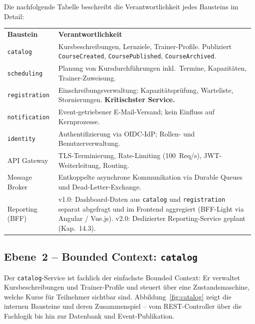 Die nachfolgende Tabelle beschreibt die Verantwortlichkeit
jedes Bausteins im Detail:

\begin{tabularx}{\textwidth}{L{2.8cm} X}
  \color{white}\textbf{Baustein} &
  \color{white}\textbf{Verantwortlichkeit} \\

  \texttt{catalog} &
  Kursbeschreibungen, Lernziele, Trainer-Profile.
  Publiziert \texttt{CourseCreated},
  \texttt{CoursePublished},
  \texttt{CourseArchived}. \\

  \texttt{scheduling} &
  Planung von Kursdurchführungen inkl.\ Termine,
  Kapazitäten, Trainer-Zuweisung. \\

  \texttt{registration} &
  Einschreibungsverwaltung: Kapazitätsprüfung,
  Warteliste, Stornierungen.
  \textbf{Kritischster Service.} \\

  \texttt{notification} &
  Event-getriebener E-Mail-Versand; kein Einfluss
  auf Kernprozesse. \\

  \texttt{identity} &
  Authentifizierung via OIDC-IdP; Rollen- und
  Benutzerverwaltung. \\

  API Gateway &
  TLS-Terminierung, Rate-Limiting (100~Req/s),
  JWT-Weiterleitung, Routing. \\

  Message Broker &
  Entkoppelte asynchrone Kommunikation via
  Durable Queues und Dead-Letter-Exchange. \\

  Reporting (BFF) &
  v1.0: Dashboard-Daten aus \texttt{catalog} und
  \texttt{registration} separat abgefragt und im
  Frontend aggregiert (BFF-Light via Angular /
  Vue.js). v2.0: Dedizierter Reporting-Service
  geplant (Kap.~14.3). \\
\end{tabularx}

\subsection{Ebene~2 -- Bounded Context: \texttt{catalog}}
\label{sec:baustein-catalog}

Der \texttt{catalog}-Service ist fachlich der einfachste
Bounded Context: Er verwaltet Kursbeschreibungen und
Trainer-Profile und steuert über eine Zustandsmaschine, welche
Kurse für Teilnehmer sichtbar sind. Abbildung~\ref{fig:catalog}
zeigt die internen Bausteine und deren Zusammenspiel -- vom
REST-Controller über die Fachlogik bis hin zur Datenbank und
Event-Publikation.

